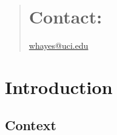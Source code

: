 \documentclass{bioinfo}
\begin{document}
\begin{abstract}

\section{Contact:} \href{whayes@uci.edu}{whayes@uci.edu}
\end{abstract}

\section{Introduction}

\subsection{Context}\label{context}
\end{document}
